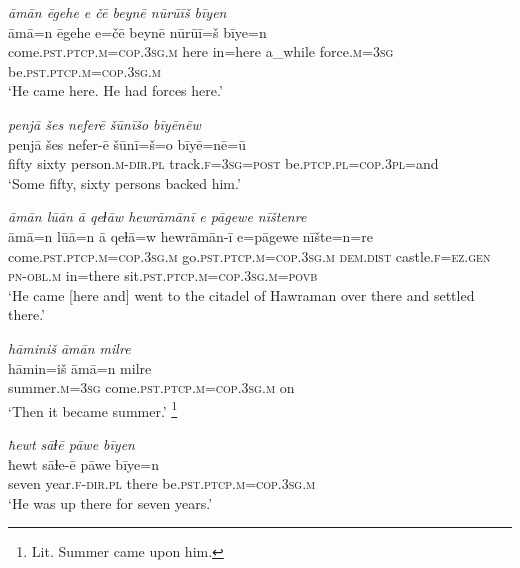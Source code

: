 \ea \label{DP.7}
\textit{āmān ēgehe e čē beynē nūrūīš bīyen} \\ 
\gll āmā=n ēgehe e=čē beynē nūrūī=š bīye=n \\ 
 come\textsc{.pst}\textsc{.ptcp}\textsc{.m}\textsc{=cop}\textsc{.3sg}\textsc{.m} here in=here a\_while force\textsc{.m}\textsc{=3sg} be\textsc{.pst}\textsc{.ptcp}\textsc{.m}\textsc{=cop}\textsc{.3sg}\textsc{.m} \\ 
\glt `He came here. He had forces here.'
\z 
 
\ea \label{DP.8}
\textit{penjā šes neferē šūnīšo bīyēnēw} \\ 
\gll penjā šes nefer-ē šūnī=š=o bīyē=nē=ū \\ 
 fifty sixty person\textsc{.m}\textsc{-dir}\textsc{.pl} track\textsc{\textsc{.f}}\textsc{=3sg}\textsc{=\textsc{post}} be\textsc{.ptcp}\textsc{.pl}\textsc{=cop}\textsc{.3pl}=and \\ 
\glt `Some fifty, sixty persons backed him.'
\z 
 
\ea \label{DP.9}
\textit{āmān lūān ā qeɫāw hewrāmānī e pāgewe nīštenre} \\ 
\gll āmā=n lūā=n ā qeɫā=w hewrāmān-ī e=pāgewe nīšte=n=re \\ 
 come\textsc{.pst}\textsc{.ptcp}\textsc{.m}\textsc{=cop}\textsc{.3sg}\textsc{.m} go\textsc{.pst}\textsc{.ptcp}\textsc{.m}\textsc{=cop}\textsc{.3sg}\textsc{.m} \textsc{dem.dist} castle\textsc{\textsc{.f}}\textsc{=ez}\textsc{.gen} \textsc{pn}\textsc{-obl}\textsc{.m} in=there sit\textsc{.pst}\textsc{.ptcp}\textsc{.m}\textsc{=cop}\textsc{.3sg}\textsc{.m}\textsc{=\textsc{povb}} \\ 
\glt `He came [here and] went to the citadel of Hawraman over there and settled there.'
\z 
 
\ea \label{DP.10}
\textit{hāminiš āmān milre} \\ 
\gll hāmin=iš āmā=n milre \\ 
 summer\textsc{.m}\textsc{=3sg} come\textsc{.pst}\textsc{.ptcp}\textsc{.m}\textsc{=cop}\textsc{.3sg}\textsc{.m} on \\ 
\glt `Then it became summer.' \footnote{Lit. Summer came upon him.}
\z 
 
\ea \label{DP.11}
\textit{ħewt sāɫē pāwe bīyen} \\ 
\gll ħewt sāɫe-ē pāwe bīye=n \\ 
 seven year\textsc{\textsc{.f}}\textsc{-dir}\textsc{.pl} there be\textsc{.pst}\textsc{.ptcp}\textsc{.m}\textsc{=cop}\textsc{.3sg}\textsc{.m} \\ 
\glt `He was up there for seven years.'
\z 
 
